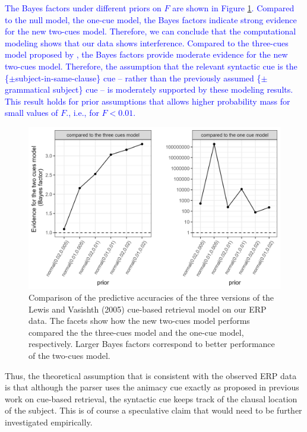 \documentclass[a4paper, man, floatsintext]{apa7}
\begin{document}
{{\textcolor{blue}{The Bayes factors under different priors on $F$ are shown in Figure \ref{fig:BF_compmods}. Compared to the null model, the one-cue model, the Bayes factors indicate strong evidence for the new two-cues model. Therefore, we can conclude that the computational modeling shows that our data shows interference. Compared to the three-cues model proposed by \textcite{mertzen}, the Bayes factors provide moderate evidence for the new two-cues model. Therefore, the assumption that the relevant syntactic cue is the \{$\pm$subject-in-same-clause\} cue – rather than the previously assumed \{$\pm$grammatical subject\} cue – is moderately supported by these modeling results. This result holds for prior assumptions that allows higher probability mass for small values of $F$., i.e., for $F<0.01$.}

\begin{figure}
    \centering
    \caption{Comparison of the predictive accuracies of the three versions of the Lewis and Vasishth (2005) cue-based retrieval model on our ERP data. The facets show how the new two-cues model performs compared the the three-cues model and the one-cue model, respectively. Larger Bayes factors correspond to better performance of the two-cues model.}
    \label{fig:BF_compmods}
    \includegraphics[width=\linewidth]{images/BF_plot_compmodels.png}
\end{figure}

Thus, the theoretical assumption that is consistent with the observed ERP data is that although the parser uses the animacy cue exactly as proposed in previous work on cue-based retrieval, the syntactic cue keeps track of the clausal location of the subject. This is of course a speculative claim that would need to be further investigated empirically. 

}}
\end{document}
